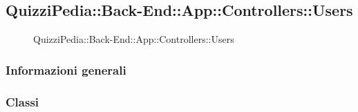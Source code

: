 \subsection{QuizziPedia::Back-End::App::Controllers::Users}
\label{QuizziPedia::Back-End::App::Controllers::Users}
\begin{figure}
	\centering

	\caption{QuizziPedia::Back-End::App::Controllers::Users}
\end{figure}
\FloatBarrier
\subsubsection{Informazioni generali}

\subsubsection{Classi}